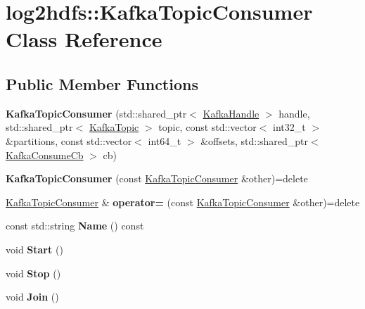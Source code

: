 \hypertarget{classlog2hdfs_1_1KafkaTopicConsumer}{}\section{log2hdfs\+:\+:Kafka\+Topic\+Consumer Class Reference}
\label{classlog2hdfs_1_1KafkaTopicConsumer}
\subsection*{Public Member Functions}
\begin{DoxyCompactItemize}
\item 
{\bfseries Kafka\+Topic\+Consumer} (std\+::shared\+\_\+ptr$<$ \hyperlink{classlog2hdfs_1_1KafkaHandle}{Kafka\+Handle} $>$ handle, std\+::shared\+\_\+ptr$<$ \hyperlink{classlog2hdfs_1_1KafkaTopic}{Kafka\+Topic} $>$ topic, const std\+::vector$<$ int32\+\_\+t $>$ \&partitions, const std\+::vector$<$ int64\+\_\+t $>$ \&offsets, std\+::shared\+\_\+ptr$<$ \hyperlink{classlog2hdfs_1_1KafkaConsumeCb}{Kafka\+Consume\+Cb} $>$ cb)\hypertarget{classlog2hdfs_1_1KafkaTopicConsumer_aa0aba731ec9b4428e52063bdbf549315}{}\label{classlog2hdfs_1_1KafkaTopicConsumer_aa0aba731ec9b4428e52063bdbf549315}

\item 
{\bfseries Kafka\+Topic\+Consumer} (const \hyperlink{classlog2hdfs_1_1KafkaTopicConsumer}{Kafka\+Topic\+Consumer} \&other)=delete\hypertarget{classlog2hdfs_1_1KafkaTopicConsumer_abaf143c438a3005e96221afb07bb7328}{}\label{classlog2hdfs_1_1KafkaTopicConsumer_abaf143c438a3005e96221afb07bb7328}

\item 
\hyperlink{classlog2hdfs_1_1KafkaTopicConsumer}{Kafka\+Topic\+Consumer} \& {\bfseries operator=} (const \hyperlink{classlog2hdfs_1_1KafkaTopicConsumer}{Kafka\+Topic\+Consumer} \&other)=delete\hypertarget{classlog2hdfs_1_1KafkaTopicConsumer_a2378626a5afccce96fa9a941d3f77ce1}{}\label{classlog2hdfs_1_1KafkaTopicConsumer_a2378626a5afccce96fa9a941d3f77ce1}

\item 
const std\+::string {\bfseries Name} () const \hypertarget{classlog2hdfs_1_1KafkaTopicConsumer_a61e864919f928ce3fc6fe62250e7ad87}{}\label{classlog2hdfs_1_1KafkaTopicConsumer_a61e864919f928ce3fc6fe62250e7ad87}

\item 
void {\bfseries Start} ()\hypertarget{classlog2hdfs_1_1KafkaTopicConsumer_afcd5fabe2949a40b633737faeda48394}{}\label{classlog2hdfs_1_1KafkaTopicConsumer_afcd5fabe2949a40b633737faeda48394}

\item 
void {\bfseries Stop} ()\hypertarget{classlog2hdfs_1_1KafkaTopicConsumer_ab0725cb2714d708fae84f94fc72aa805}{}\label{classlog2hdfs_1_1KafkaTopicConsumer_ab0725cb2714d708fae84f94fc72aa805}

\item 
void {\bfseries Join} ()\hypertarget{classlog2hdfs_1_1KafkaTopicConsumer_ad494bb532ae3bfa7b10c023291dcd7c2}{}\label{classlog2hdfs_1_1KafkaTopicConsumer_ad494bb532ae3bfa7b10c023291dcd7c2}

\end{DoxyCompactItemize}
